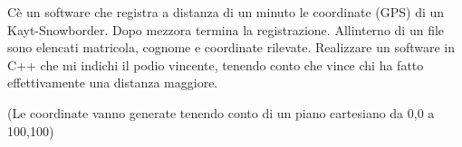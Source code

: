 C\textquotesingle{}è un software che registra a distanza di un minuto le coordinate (GPS) di un Kayt-\/\+Snowborder. Dopo mezz\textquotesingle{}ora termina la registrazione. All\textquotesingle{}interno di un file sono elencati matricola, cognome e coordinate rilevate. Realizzare un software in C++ che mi indichi il podio vincente, tenendo conto che vince chi ha fatto effettivamente una distanza maggiore.

(Le coordinate vanno generate tenendo conto di un piano cartesiano da 0,0 a 100,100) 